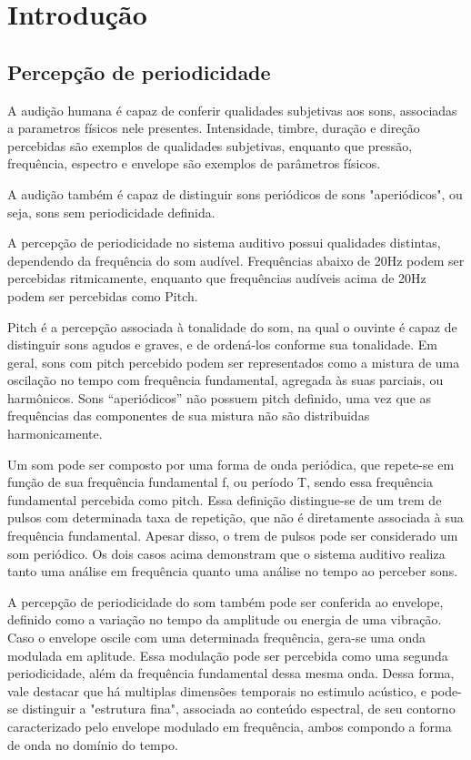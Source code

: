 \chapter{Introdu{\c c}\~ao}
\section{Percepção de periodicidade}
A audição humana é capaz de conferir qualidades subjetivas aos sons, associadas
a parametros físicos nele presentes. Intensidade, timbre, duração e direção percebidas
são exemplos de qualidades subjetivas, enquanto que pressão, frequência,
espectro e envelope são exemplos de parâmetros físicos.\cite{rossing2002}

A audição também é capaz de distinguir sons periódicos de sons "aperiódicos", ou seja,
 sons sem periodicidade definida.

A percepção de periodicidade no sistema auditivo possui qualidades distintas,
 dependendo da frequência do som audível. Frequências abaixo de
20Hz podem ser percebidas ritmicamente, enquanto que frequências audíveis acima de
 20Hz podem ser percebidas como Pitch.

Pitch é a percepção associada à tonalidade do som, na qual o ouvinte é capaz
de distinguir sons agudos e graves, e de ordená-los conforme sua tonalidade.
 Em geral, sons com pitch percebido podem ser representados como a mistura de uma
oscilação no tempo com frequência fundamental, agregada às suas parciais, ou
 harmônicos. Sons ``aperiódicos'' não possuem pitch definido, uma vez que as frequências das
 componentes de sua mistura não são distribuidas harmonicamente. \cite{langner1992} \cite{angus2009} 

 Um som pode ser composto por uma forma de onda periódica, que
 repete-se em função de sua frequência fundamental f, ou período T, sendo essa 
 frequência fundamental percebida como pitch. Essa definição distingue-se de um
 trem de pulsos com determinada taxa de repetição, que não é diretamente
 associada à sua frequência fundamental. Apesar disso, o trem de pulsos pode ser
considerado um som periódico. Os dois casos acima demonstram que o sistema
auditivo realiza tanto uma análise em frequência quanto uma análise no tempo
ao perceber sons. \cite{rossing2002}  


A percepção de periodicidade do som também pode ser conferida ao envelope,
definido como a variação no tempo da amplitude ou energia de uma vibração.
Caso o envelope oscile com uma determinada frequência, gera-se uma onda
modulada em aplitude.
Essa modulação pode ser percebida como uma segunda periodicidade,
além da frequência fundamental dessa mesma onda. Dessa forma, vale destacar
que há multiplas dimensões temporais no estimulo acústico, e pode-se distinguir
a "estrutura fina", associada ao conteúdo espectral, de seu contorno caracterizado
pelo envelope modulado em frequência, ambos compondo a forma de onda no
domínio do tempo. \cite{joris2004}


